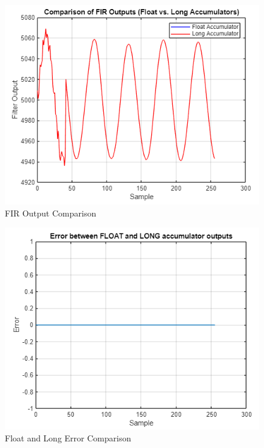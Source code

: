 \documentclass[journal]{IEEEtran}
\begin{document}
\begin{figure}[H]
    \centering
    \includegraphics[width=\linewidth]{5.1.png}
    \caption{FIR Output Comparison}
    \label{fig:part5A}
\end{figure}

\begin{figure}[H]
    \centering
    \includegraphics[width=\linewidth]{5.2.png}
    \caption{Float and Long Error Comparison}
    \label{fig:part5B}
\end{figure}
\end{document}

